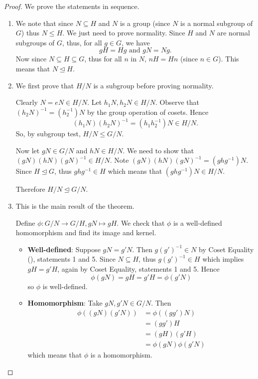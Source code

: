 \begin{proof}
    We prove the statements in sequence.

    \begin{enumerate}
        \item We note that since $N \subseteq H$ and $N$ is a group (since $N$ is a normal subgroup of $G$) thus $N \leq H$. We just need to prove normality. Since $H$ and $N$ are normal subgroups of $G$, thus, for all $g \in G$, we have
        \[
            gH = Hg \text{ and } gN = Ng.
        \]
        Now since $N \subseteq H \subseteq G$, thus for all $n$ in $N$, $nH = Hn$ (since $n \in G$). This means that $N \unlhd H$.

        \item We first prove that $H/N$ is a subgroup before proving normality.

        Clearly $N = eN \in H/N$. Let $h_1N, h_2N \in H/N$. Observe that $(h_2N)^{-1} = \left(h_2^{-1}\right)N$ by the group operation of cosets. Hence
        \[
            (h_1N)(h_2N)^{-1} = (h_1h_2^{-1})N \in H/N.
        \]
        So, by subgroup test, $H/N \leq G/N$.

        Now let $gN \in G/N$ and $hN \in H/N$. We need to show that $(gN)(hN)(gN)^{-1} \in H/N$. Note $(gN)(hN)(gN)^{-1} = (ghg^{-1})N$. Since $H \unlhd G$, thus $ghg^{-1} \in H$ which means that $(ghg^{-1})N \in H/N$.

        Therefore $H/N \unlhd G/N$.

        \item This is the main result of the theorem.

        Define $\phi: G/N \to G/H, gN \mapsto gH$. We check that $\phi$ is a well-defined homomorphism and find its image and kernel.
        \begin{itemize}
            \item \textbf{Well-defined}: Suppose $gN = g'N$. Then $g(g')^{-1} \in N$ by Coset Equality (), statements 1 and 5. Since $N \subseteq H$, thus $g(g')^{-1} \in H$ which implies $gH = g'H$, again by Coset Equality, statements 1 and 5. Hence
            \[
                \phi(gN) = gH = g'H = \phi(g'N)
            \]
            so $\phi$ is well-defined.

            \item \textbf{Homomorphism}: Take $gN, g'N \in G/N$. Then
            \begin{align*}
                \phi((gN)(g'N)) &= \phi((gg')N)\\
                &= (gg')H\\
                &= (gH)(g'H)\\
                &= \phi(gN)\phi(g'N)
            \end{align*}
            which means that $\phi$ is a homomorphism.


\end{itemize}
\end{enumerate}
\end{proof}

